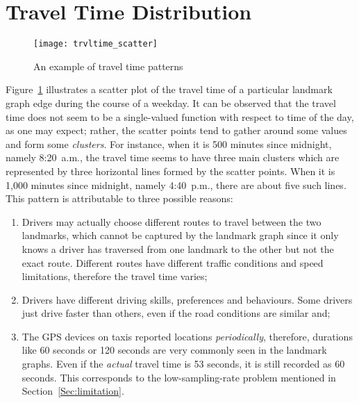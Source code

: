 \begin{table}[h!]
\centering
{}
\caption{A summary of landmark graphs}\label{Ta:ldmkgraphs}
\end{table}

\section{Travel Time Distribution}
\begin{figure}[h!]
\texttt{[image: trvltime\_scatter]}
\centering
\caption{An example of travel time patterns}\label{Fig:wrkd_50m_trvltime}
\end{figure}

Figure~\ref{Fig:wrkd_50m_trvltime} illustrates a scatter plot of the travel time of a particular landmark graph edge during the course of a weekday. It can be observed that the travel time does not seem to be a single-valued function with respect to time of the day, as one may expect; rather, the scatter points tend to gather around some values and form some \emph{clusters}. For instance, when it is 500 minutes since midnight, namely 8:20~a.m., the travel time seems to have three main clusters which are represented by three horizontal lines formed by the scatter points. When it is 1,000 minutes since midnight, namely 4:40~p.m., there are about five such lines. This pattern is attributable to three possible reasons:
\begin{enumerate}
\item Drivers may actually choose different routes to travel between the two landmarks, which cannot be captured by the landmark graph since it only knows a driver has traversed from one landmark to the other but not the exact route. Different routes have different traffic conditions and speed limitations, therefore the travel time varies;
\item Drivers have different driving skills, preferences and behaviours. Some drivers just drive faster than others, even if the road conditions are similar and;
\item The GPS devices on taxis reported locations \emph{periodically}, therefore, durations like 60 seconds or 120 seconds are very commonly seen in the landmark graphs. Even if the \emph{actual} travel time is 53 seconds, it is still recorded as 60 seconds. This corresponds to the low-sampling-rate problem mentioned in Section~\ref{Sec:limitation}. 
\end{enumerate}

